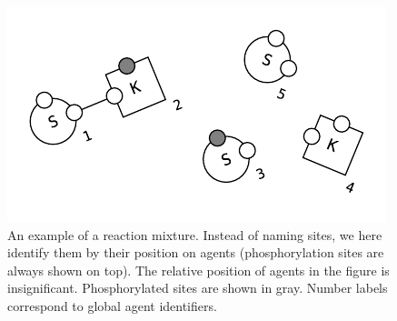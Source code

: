 \begin{figure}[!h]
  \vskip -0.25cm
  \begin{center}
    \includegraphics[scale=0.9]{figures/mixture.pdf}
  \end{center}
  \vskip -0.5cm
  \caption{An example of a reaction mixture. Instead of naming sites,
    we here identify them by their position on agents (phosphorylation
    sites are always shown on top). The relative position of agents in
    the figure is insignificant.  Phosphorylated sites are shown in
    gray.  Number labels correspond to global agent identifiers. }
  \label{fig:mixture}
\end{figure}
